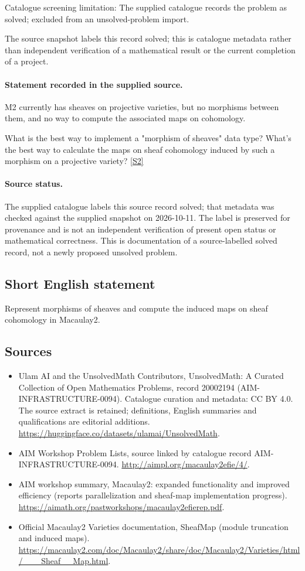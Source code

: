 \documentclass[11pt]{article}
\begin{document}
Catalogue screening limitation: The supplied catalogue records the problem as solved; excluded from an unsolved-problem import.

The source snapshot labels this record solved; this is catalogue metadata rather than independent verification of a mathematical result or the current completion of a project.
\paragraph{Statement recorded in the supplied source.}
M2 currently has sheaves on projective varieties, but no morphisms between them, and no way to compute the associated maps on cohomology.

What is the best way to implement a "morphism of sheaves" data type? What's the best way to calculate the maps on sheaf cohomology induced by such a morphism on a projective variety? \href{http://aimpl.org/macaulay2efie/4/}{[S2]}
\paragraph{Source status.}
The supplied catalogue labels this source record solved; that metadata was checked against the supplied snapshot on 2026-10-11. The label is preserved for provenance and is not an independent verification of present open status or mathematical correctness. This is documentation of a source-labelled solved record, not a newly proposed unsolved problem.
\subsection{Short English statement}
Represent morphisms of sheaves and compute the induced maps on sheaf cohomology in Macaulay2.
\subsection{Sources}
\begin{itemize}
\item[S1] Ulam AI and the UnsolvedMath Contributors, UnsolvedMath: A Curated Collection of Open Mathematics Problems, record 20002194 (AIM-INFRASTRUCTURE-0094). Catalogue curation and metadata: CC BY 4.0. The source extract is retained; definitions, English summaries and qualifications are editorial additions.
\url{https://huggingface.co/datasets/ulamai/UnsolvedMath}.
\item[S2] AIM Workshop Problem Lists, source linked by catalogue record AIM-INFRASTRUCTURE-0094.
\url{http://aimpl.org/macaulay2efie/4/}.
\item[S3] AIM workshop summary, Macaulay2: expanded functionality and improved efficiency (reports parallelization and sheaf-map implementation progress).
\url{https://aimath.org/pastworkshops/macaulay2efierep.pdf}.
\item[S4] Official Macaulay2 Varieties documentation, SheafMap (module truncation and induced maps).
\url{https://macaulay2.com/doc/Macaulay2/share/doc/Macaulay2/Varieties/html/___Sheaf__Map.html}.
\end{itemize}
\end{document}

